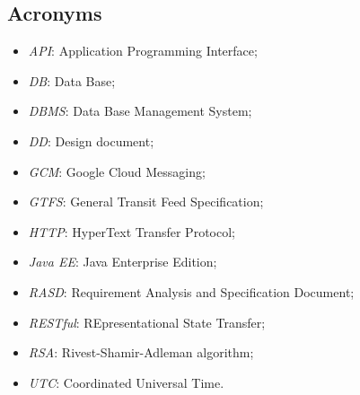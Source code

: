 \subsection{Acronyms}
	\begin{itemize}
	\item \textit{API}: Application Programming Interface;
	\item \textit{DB}: Data Base;
	\item \textit{DBMS}: Data Base Management System;
	\item \textit{DD}: Design document;
	\item \textit{GCM}: Google Cloud Messaging;
	\item \textit{GTFS}: General Transit Feed Specification;
	\item \textit{HTTP}: HyperText Transfer Protocol;
	\item \textit{Java EE}: Java Enterprise Edition;
	\item \textit{RASD}: Requirement Analysis and Specification Document;
	\item \textit{RESTful}: REpresentational State Transfer;
	\item \textit{RSA}: Rivest-Shamir-Adleman algorithm;
	\item \textit{UTC}: Coordinated Universal Time.
	\end{itemize}
	
